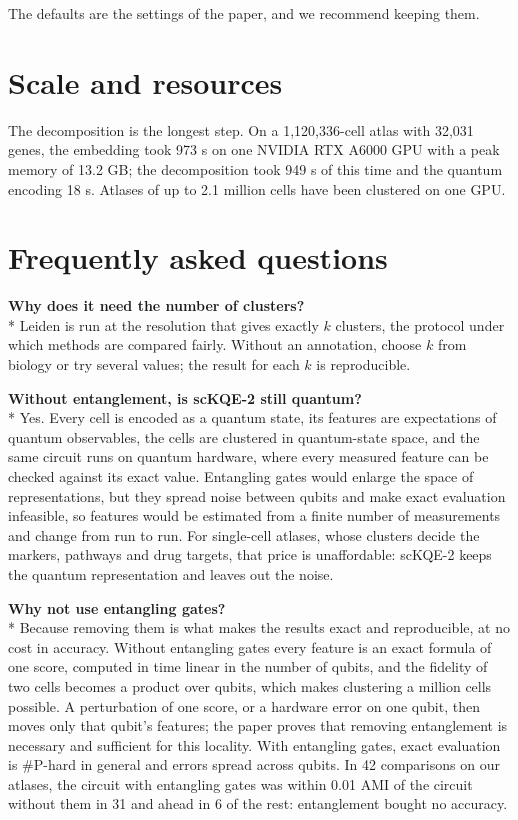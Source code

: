 \documentclass[11pt]{article}
\begin{document}
The defaults are the settings of the paper, and we recommend keeping them.

\section{Scale and resources}
The decomposition is the longest step. On a 1,120,336-cell atlas with 32,031 genes, the embedding took 973 s on one NVIDIA RTX A6000 GPU with a peak memory of 13.2 GB; the decomposition took 949 s of this time and the quantum encoding 18 s. Atlases of up to 2.1 million cells have been clustered on one GPU.

\section{Frequently asked questions}
\textbf{Why does it need the number of clusters?}\\*
Leiden is run at the resolution that gives exactly $k$ clusters, the protocol under which methods are compared fairly. Without an annotation, choose $k$ from biology or try several values; the result for each $k$ is reproducible.

\textbf{Without entanglement, is scKQE-2 still quantum?}\\*
Yes. Every cell is encoded as a quantum state, its features are expectations of quantum observables, the cells are clustered in quantum-state space, and the same circuit runs on quantum hardware, where every measured feature can be checked against its exact value. Entangling gates would enlarge the space of representations, but they spread noise between qubits and make exact evaluation infeasible, so features would be estimated from a finite number of measurements and change from run to run. For single-cell atlases, whose clusters decide the markers, pathways and drug targets, that price is unaffordable: scKQE-2 keeps the quantum representation and leaves out the noise.

\textbf{Why not use entangling gates?}\\*
Because removing them is what makes the results exact and reproducible, at no cost in accuracy. Without entangling gates every feature is an exact formula of one score, computed in time linear in the number of qubits, and the fidelity of two cells becomes a product over qubits, which makes clustering a million cells possible. A perturbation of one score, or a hardware error on one qubit, then moves only that qubit's features; the paper proves that removing entanglement is necessary and sufficient for this locality. With entangling gates, exact evaluation is \#P-hard in general and errors spread across qubits. In 42 comparisons on our atlases, the circuit with entangling gates was within 0.01 AMI of the circuit without them in 31 and ahead in 6 of the rest: entanglement bought no accuracy.
\end{document}
